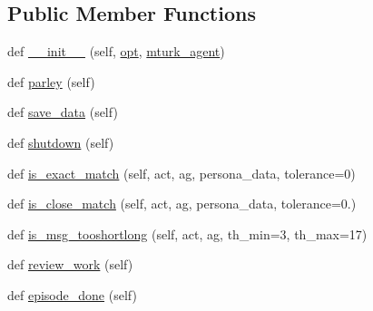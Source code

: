 \subsection*{Public Member Functions}
\begin{DoxyCompactItemize}
\item 
def \hyperlink{classparlai_1_1mturk_1_1tasks_1_1personachat_1_1personachat__rephrase_1_1worlds_1_1RephrasePersonaWorld_ad1233f06112e4610c431b5e8748ea112}{\+\_\+\+\_\+init\+\_\+\+\_\+} (self, \hyperlink{classparlai_1_1mturk_1_1tasks_1_1personachat_1_1personachat__rephrase_1_1worlds_1_1RephrasePersonaWorld_a269f17c34e03fc114ea2f32a1259329c}{opt}, \hyperlink{classparlai_1_1mturk_1_1tasks_1_1personachat_1_1personachat__rephrase_1_1worlds_1_1RephrasePersonaWorld_a2c0f9b07a76f3ccf3f973664550a3dcc}{mturk\+\_\+agent})
\item 
def \hyperlink{classparlai_1_1mturk_1_1tasks_1_1personachat_1_1personachat__rephrase_1_1worlds_1_1RephrasePersonaWorld_a534d1775b3a45b3765ea0ee65c5cc201}{parley} (self)
\item 
def \hyperlink{classparlai_1_1mturk_1_1tasks_1_1personachat_1_1personachat__rephrase_1_1worlds_1_1RephrasePersonaWorld_ae86cecd0a95976424b21edf2caa528af}{save\+\_\+data} (self)
\item 
def \hyperlink{classparlai_1_1mturk_1_1tasks_1_1personachat_1_1personachat__rephrase_1_1worlds_1_1RephrasePersonaWorld_abe6f2632804c97abb5889f55aefecaa1}{shutdown} (self)
\item 
def \hyperlink{classparlai_1_1mturk_1_1tasks_1_1personachat_1_1personachat__rephrase_1_1worlds_1_1RephrasePersonaWorld_aeacff52acea3e04d7887c5b0a4b3b37a}{is\+\_\+exact\+\_\+match} (self, act, ag, persona\+\_\+data, tolerance=0)
\item 
def \hyperlink{classparlai_1_1mturk_1_1tasks_1_1personachat_1_1personachat__rephrase_1_1worlds_1_1RephrasePersonaWorld_a10d5c2ab0c066ccbea89be4a01729415}{is\+\_\+close\+\_\+match} (self, act, ag, persona\+\_\+data, tolerance=0.)
\item 
def \hyperlink{classparlai_1_1mturk_1_1tasks_1_1personachat_1_1personachat__rephrase_1_1worlds_1_1RephrasePersonaWorld_a0f7d1da525b71529c408a4f944fa036a}{is\+\_\+msg\+\_\+tooshortlong} (self, act, ag, th\+\_\+min=3, th\+\_\+max=17)
\item 
def \hyperlink{classparlai_1_1mturk_1_1tasks_1_1personachat_1_1personachat__rephrase_1_1worlds_1_1RephrasePersonaWorld_a800d5049a7b9ea6bd7759e57771da0f7}{review\+\_\+work} (self)
\item 
def \hyperlink{classparlai_1_1mturk_1_1tasks_1_1personachat_1_1personachat__rephrase_1_1worlds_1_1RephrasePersonaWorld_ac28503baefd501823d761360bb07356e}{episode\+\_\+done} (self)
\end{DoxyCompactItemize}
